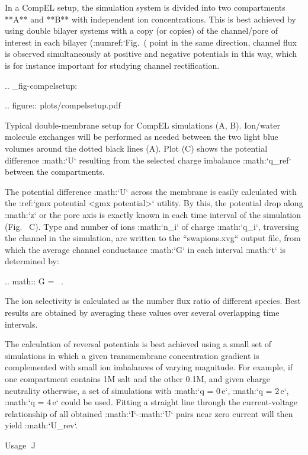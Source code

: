 In a CompEL setup, the simulation system is divided into two
compartments **A** and **B** with independent ion concentrations. This
is best achieved by using double bilayer systems with a copy (or copies)
of the channel/pore of interest in each bilayer
(:numref:`Fig. (%
point in the same direction, channel flux is observed simultaneously at
positive and negative potentials in this way, which is for instance
important for studying channel rectification.

.. _fig-compelsetup:

.. figure:: plots/compelsetup.pdf

   Typical double-membrane setup for CompEL simulations (A, B).
   Ion/water molecule exchanges will be performed as needed between the
   two light blue volumes around the dotted black lines (A). Plot (C)
   shows the potential difference :math:`\Delta U` resulting from the
   selected charge imbalance :math:`\Delta q_{ref}` between the
   compartments.

The potential difference :math:`\Delta U` across the membrane is easily
calculated with the :ref:`gmx potential <gmx potential>` utility. By this, the
potential drop along :math:`z` or the pore axis is exactly known in each
time interval of the simulation (Fig. 
C). Type and number of ions :math:`n_i` of charge :math:`q_i`,
traversing the channel in the simulation, are written to the
``swapions.xvg`` output file, from which the average channel
conductance :math:`G` in each interval :math:`\Delta t` is determined
by:

.. math:: G =  \, .

The ion selectivity is calculated as the number flux ratio of different
species. Best results are obtained by averaging these values over
several overlapping time intervals.

The calculation of reversal potentials is best achieved using a small
set of simulations in which a given transmembrane concentration gradient
is complemented with small ion imbalances of varying magnitude. For
example, if one compartment contains 1M salt and the other 0.1M, and
given charge neutrality otherwise, a set of simulations with
:math:`\Delta q = 0\,e`, :math:`\Delta q = 2\,e`,
:math:`\Delta q = 4\,e` could be used. Fitting a straight line through
the current-voltage relationship of all obtained :math:`I`-:math:`U`
pairs near zero current will then yield :math:`U_{rev}`.

Usage
^^^^^

